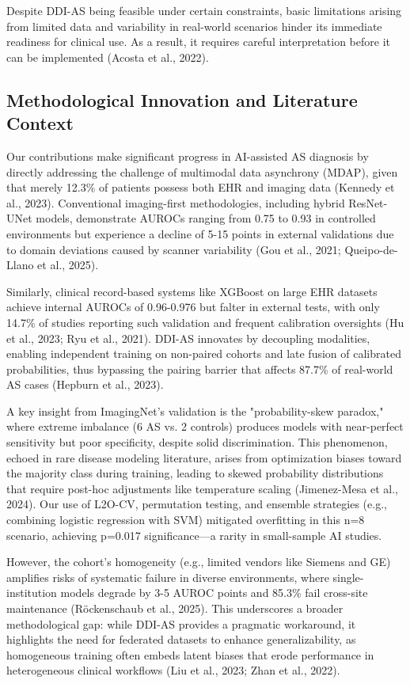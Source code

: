 \documentclass[12pt, a4paper]{article}
\begin{document}
Despite DDI-AS being feasible under certain constraints, basic limitations arising from limited data and variability in real-world scenarios hinder its immediate readiness for clinical use. As a result, it requires careful interpretation before it can be implemented (Acosta et al., 2022).

\subsection{Methodological Innovation and Literature Context}
Our contributions make significant progress in AI-assisted AS diagnosis by directly addressing the challenge of multimodal data asynchrony (MDAP), given that merely 12.3\% of patients possess both EHR and imaging data (Kennedy et al., 2023). Conventional imaging-first methodologies, including hybrid ResNet-UNet models, demonstrate AUROCs ranging from 0.75 to 0.93 in controlled environments but experience a decline of 5-15 points in external validations due to domain deviations caused by scanner variability (Gou et al., 2021; Queipo-de-Llano et al., 2025).

Similarly, clinical record-based systems like XGBoost on large EHR datasets achieve internal AUROCs of 0.96-0.976 but falter in external tests, with only 14.7\% of studies reporting such validation and frequent calibration oversights (Hu et al., 2023; Ryu et al., 2021). DDI-AS innovates by decoupling modalities, enabling independent training on non-paired cohorts and late fusion of calibrated probabilities, thus bypassing the pairing barrier that affects 87.7\% of real-world AS cases (Hepburn et al., 2023).

A key insight from ImagingNet's validation is the "probability-skew paradox," where extreme imbalance (6 AS vs. 2 controls) produces models with near-perfect sensitivity but poor specificity, despite solid discrimination. This phenomenon, echoed in rare disease modeling literature, arises from optimization biases toward the majority class during training, leading to skewed probability distributions that require post-hoc adjustments like temperature scaling (Jimenez-Mesa et al., 2024). Our use of L2O-CV, permutation testing, and ensemble strategies (e.g., combining logistic regression with SVM) mitigated overfitting in this n=8 scenario, achieving p=0.017 significance—a rarity in small-sample AI studies. 

However, the cohort's homogeneity (e.g., limited vendors like Siemens and GE) amplifies risks of systematic failure in diverse environments, where single-institution models degrade by 3-5 AUROC points and 85.3\% fail cross-site maintenance (Röckenschaub et al., 2025). This underscores a broader methodological gap: while DDI-AS provides a pragmatic workaround, it highlights the need for federated datasets to enhance generalizability, as homogeneous training often embeds latent biases that erode performance in heterogeneous clinical workflows (Liu et al., 2023; Zhan et al., 2022).
\end{document}
